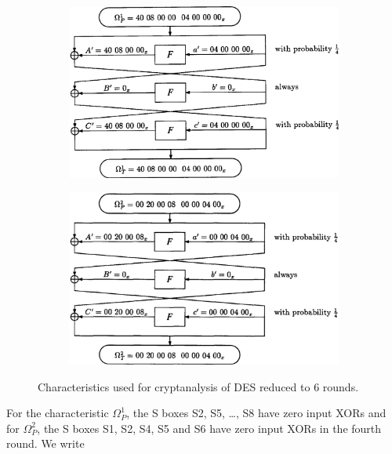 \documentclass[twoside]{article}
\begin{document}
\begin{figure}[!ht]
    \centering
    \begin{subfigure}{0.45\linewidth}
        \includegraphics[width=\linewidth]{images/des_6round_char1.png}
        \label{fig:des-6-char1}
    \end{subfigure}
    \hfill
    \begin{subfigure}{0.45\linewidth}
        \includegraphics[width=\linewidth]{images/des_6round_char2.png}
        \label{fig:des-6-char2}
    \end{subfigure}
    \caption{Characteristics used for cryptanalysis of DES reduced to 6 rounds.}
    \label{fig:des-6-char}
\end{figure}

For the characteristic \(\Omega_P^1\), the S boxes S2, S5, \dots, S8 have zero
input XORs and for \(\Omega_P^2\), the S boxes S1, S2, S4, S5 and S6 have zero
input XORs in the fourth round. We write
\end{document}
